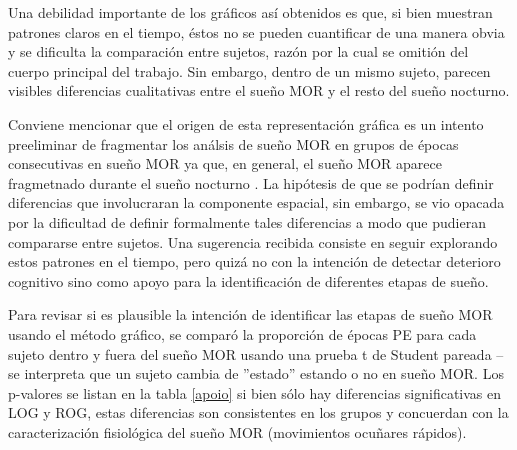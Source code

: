 Una debilidad importante de los gr\'aficos as\'i obtenidos es que, si bien muestran patrones 
claros en el tiempo, \'estos no se pueden cuantificar de una manera obvia y se dificulta la
comparaci\'on entre sujetos, raz\'on por la cual se omiti\'on del cuerpo principal del trabajo. 
Sin embargo, dentro de un mismo sujeto, parecen visibles diferencias cualitativas
entre el sue\~no MOR y el resto del sue\~no nocturno.

Conviene mencionar que el origen de esta representaci\'on gr\'afica es un intento preeliminar de
fragmentar los an\'alsis de sue\~no MOR en grupos de \'epocas consecutivas en sue\~no MOR ya que,
en general, el sue\~no MOR aparece fragmetnado durante el sue\~no nocturno \cite{CarrilloMora}.
La hip\'otesis de que se podr\'ian definir diferencias que involucraran la componente espacial,
sin embargo, se vio opacada por la dificultad de definir formalmente tales diferencias a modo
que pudieran compararse entre sujetos.
Una sugerencia recibida consiste en seguir explorando estos patrones en el tiempo, pero quiz\'a
no con la intenci\'on de detectar deterioro cognitivo sino como apoyo para la identificaci\'on de
diferentes etapas de sue\~no.


Para revisar si es plausible la intenci\'on de identificar las etapas de sue\~no MOR usando el
m\'etodo gr\'afico,
se compar\'o la proporci\'on
de \'epocas PE para cada sujeto dentro y fuera del sue\~no MOR usando una prueba t de Student 
pareada --se interpreta que un sujeto cambia de ''estado'' estando o no en sue\~no MOR.
Los p-valores se listan en la tabla \ref{apoio}
si bien s\'olo hay diferencias significativas en LOG y ROG, estas diferencias son consistentes
en los grupos y concuerdan con la caracterizaci\'on fisiol\'ogica del sue\~no MOR (movimientos
ocuñares r\'apidos).


